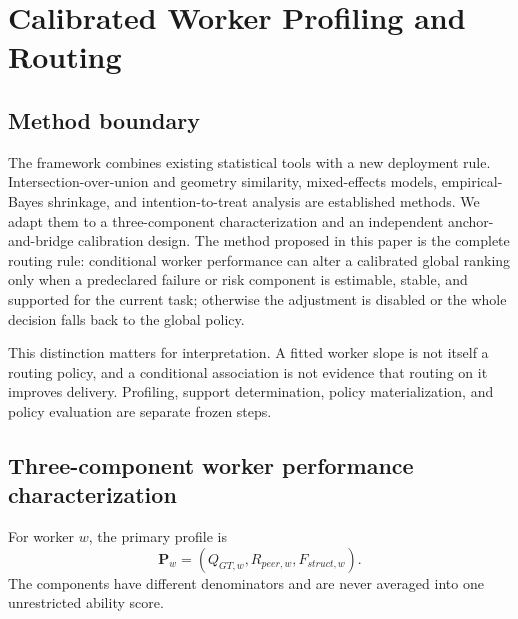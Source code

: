 \section{Calibrated Worker Profiling and Routing}
\label{sec:profiling}

\subsection{Method boundary}

The framework combines existing statistical tools with a new deployment rule. Intersection-over-union and geometry similarity, mixed-effects models, empirical-Bayes shrinkage, and intention-to-treat analysis are established methods. We adapt them to a three-component characterization and an independent anchor-and-bridge calibration design. The method proposed in this paper is the complete routing rule: conditional worker performance can alter a calibrated global ranking only when a predeclared failure or risk component is estimable, stable, and supported for the current task; otherwise the adjustment is disabled or the whole decision falls back to the global policy.

This distinction matters for interpretation. A fitted worker slope is not itself a routing policy, and a conditional association is not evidence that routing on it improves delivery. Profiling, support determination, policy materialization, and policy evaluation are separate frozen steps.

\subsection{Three-component worker performance characterization}

For worker $w$, the primary profile is
\begin{equation}
  \boldsymbol{P}_w = (Q_{GT,w}, R_{peer,w}, F_{struct,w}).
  \label{eq:profile}
\end{equation}
The components have different denominators and are never averaged into one unrestricted ability score.

